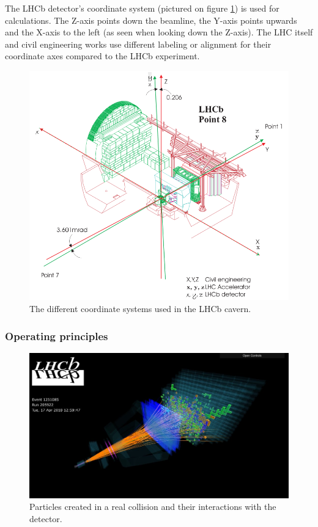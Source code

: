 \documentclass[12pt]{article}
\begin{document}
The LHCb detector's coordinate system (pictured on figure \ref{fig_lhcb_coordinate_systems}) is used for calculations. The Z-axis points down the beamline, the Y-axis points upwards and the X-axis to the left (as seen when looking down the Z-axis). The LHC itself and civil engineering works use different labeling or alignment for their coordinate axes compared to the LHCb experiment.

\begin{figure}[H]
	\includegraphics[width=\textwidth]{intro_lhcb_coordinate_systems}
	\caption[LHCb coordinate systems]{The different coordinate systems used in the LHCb cavern. \cite{lhcb_coordinate_systems}}
	\label{fig_lhcb_coordinate_systems}
\end{figure}


\subsubsection{Operating principles}\label{sec_lhcb_det_theory}

\begin{figure}[h]
	\includegraphics[width=\textwidth]{lbevent_collision_example}
	\caption[A particle collision event in LHCb]{Particles created in a real collision and their interactions with the detector. \cite{lb_event_display}}
	\label{fig_lhcb_lbevent_collision}
\end{figure}
\end{document}
